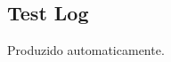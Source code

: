 \documentclass[12pt,letterpaper]{article}
\begin{document}
\pagebreak
\subsection{Test Log}

Produzido automaticamente. %





%
\end{document}
